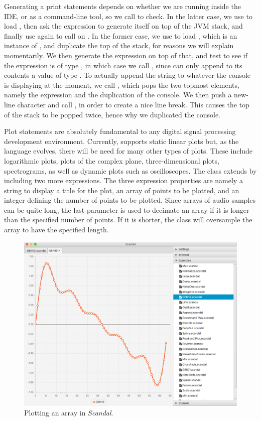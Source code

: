Generating a print statements depends on whether we are running inside the IDE, or as a command-line tool, so we call  to check. In the latter case, we use  to load , then ask the expression to generate itself on top of the JVM stack, and finally use  again to call  on . In the former case, we use  to load , which is an instance of , and duplicate the top of the stack, for reasons we will explain momentarily. We then generate the expression on top of that, and test to see if the expression is of type , in which case we call , since  can only append to its contents a value of type . To actually append the string to whatever the console is displaying at the moment, we call , which pops the two topmost elements, namely the expression and the duplication of the console. We then push a new-line character and call , in order to create a nice line break. This causes the top of the stack to be popped twice, hence why we duplicated the console.

Plot statements are absolutely fundamental to any digital signal processing development environment. Currently,  supports static linear plots but, as the language evolves, there will be need for many other types of plots. These include logarithmic plots, plots of the complex plane, three-dimensional plots, spectrograms, as well as dynamic plots such as oscilloscopes. The  class extends  by including two more expressions. The three expression properties are namely a string to display a title for the plot, an array of points to be plotted, and an integer defining the number of points to be plotted. Since arrays of audio samples can be quite long, the last parameter is used to decimate an array if it is longer than the specified number of points. If it is shorter, the  class will oversample the array to have the specified length.

\begin{figure}[b!]
	\includegraphics[width=4.5in]{img/plot}
	\caption[Plotting an array in \emph{Scandal}.]{Plotting an array in \emph{Scandal}.}
\end{figure}

